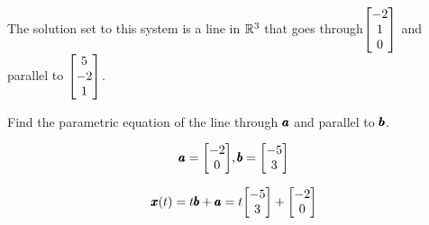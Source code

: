 \documentclass{../mathhomework}
\newenvironment{Mat}{\begin{bmatrix}}{\end{bmatrix}}
\begin{document}
\begin{problem}[1.5\#15]
\begin{solution}
        The solution set to this system is a line in $\mathbb{R}^3$ that goes through$\begin{Mat}
            -2\\1\\0
        \end{Mat}$ and parallel to $\begin{Mat}
            5\\-2\\1
        \end{Mat}$.
    \end{solution}
\end{problem} 

\begin{problem}[1.5\#19]
    Find the parametric equation of the line through $\pmb{a}$ and parallel to $\pmb{b}$.

    \begin{equation*}
        \Vect{a} = \begin{Mat}
            -2 \\ 0
        \end{Mat}, \Vect{b} = \begin{Mat}
            -5 \\ 3
        \end{Mat}
    \end{equation*}

    \begin{solution}
        \begin{equation*}
            \Vect{x}(t) = t\Vect{b} + \Vect{a} = t\begin{Mat}-5\\3\end{Mat}  + \begin{Mat}-2\\0\end{Mat}
        \end{equation*}
    \end{solution}
\end{problem}
\end{document}
